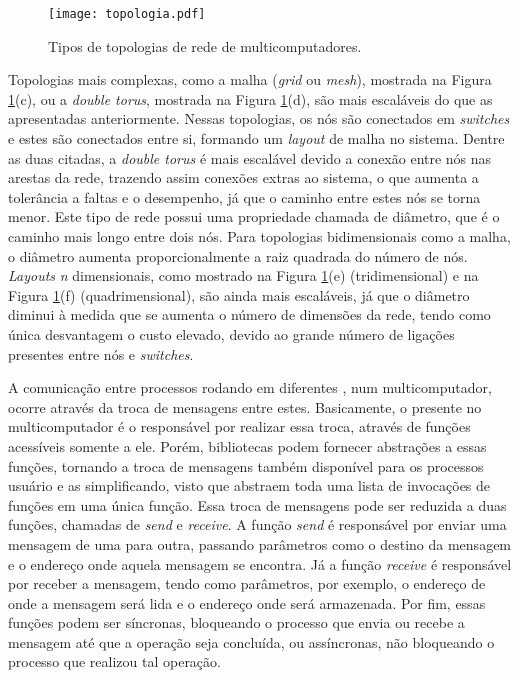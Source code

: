 \begin{figure}[tb]
  \centering
  \caption{Tipos de topologias de rede de multicomputadores.}
  \label{fig:topologiamulticomputadores}
  \texttt{[image: topologia.pdf]}
\end{figure}

Topologias mais complexas, como a malha (\textit{grid} ou \textit{mesh}), mostrada na Figura \ref{fig:topologiamulticomputadores}(c), ou a \textit{double torus}, mostrada na Figura \ref{fig:topologiamulticomputadores}(d), são mais escaláveis do que as apresentadas anteriormente. Nessas topologias, os nós são conectados em \textit{switches} e estes são conectados entre si, formando um \textit{layout} de malha no sistema. Dentre as duas citadas, a \textit{double torus} é mais escalável devido a conexão entre nós nas arestas da rede, trazendo assim conexões extras ao sistema, o que aumenta a tolerância a faltas e o desempenho, já que o caminho entre estes nós se torna menor. Este tipo de rede possui uma propriedade chamada de diâmetro, que é o caminho mais longo entre dois nós. Para topologias bidimensionais como a malha, o diâmetro aumenta proporcionalmente a raiz quadrada do número de nós. \textit{Layouts} \textit{n} dimensionais, como mostrado na Figura \ref{fig:topologiamulticomputadores}(e) (tridimensional) e na Figura \ref{fig:topologiamulticomputadores}(f) (quadrimensional), são ainda mais escaláveis, já que o diâmetro diminui à medida que se aumenta o número de dimensões da rede, tendo como única desvantagem o custo elevado, devido ao grande número de ligações presentes entre nós e \textit{switches}.

A comunicação entre processos rodando em diferentes \CPUs, num multicomputador, ocorre através da troca de mensagens entre estes. Basicamente, o \SO presente no multicomputador é o responsável por realizar essa troca, através de funções acessíveis somente a ele. Porém, bibliotecas podem fornecer abstrações a essas funções, tornando a troca de mensagens também disponível para os processos usuário e as simplificando, visto que abstraem toda uma lista de invocações de funções em uma única função. Essa troca de mensagens pode ser reduzida a duas funções, chamadas de \textit{send} e \textit{receive}. A função \textit{send} é responsável por enviar uma mensagem de uma \CPU para outra, passando parâmetros como o destino da mensagem e o endereço onde aquela mensagem se encontra. Já a função \textit{receive} é responsável por receber a mensagem, tendo como parâmetros, por exemplo, o endereço de onde a mensagem será lida e o endereço onde será armazenada. Por fim, essas funções podem ser síncronas, bloqueando o processo que envia ou recebe a mensagem até que a operação seja concluída, ou assíncronas, não bloqueando o processo que realizou tal operação.

